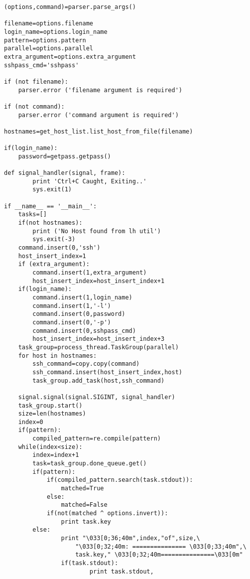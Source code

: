\documentclass[a4paper,11pt]{article}
\begin{document}
\begin{lstlisting}
(options,command)=parser.parse_args()

filename=options.filename
login_name=options.login_name
pattern=options.pattern
parallel=options.parallel
extra_argument=options.extra_argument
sshpass_cmd='sshpass'

if (not filename):
    parser.error ('filename argument is required')

if (not command):
    parser.error ('command argument is required')

hostnames=get_host_list.list_host_from_file(filename)

if(login_name):
    password=getpass.getpass()

def signal_handler(signal, frame):
        print 'Ctrl+C Caught, Exiting..'
        sys.exit(1)

if __name__ == '__main__':
    tasks=[]
    if(not hostnames):
        print ('No Host found from lh util')
        sys.exit(-3)
    command.insert(0,'ssh')
    host_insert_index=1
    if (extra_argument):
        command.insert(1,extra_argument)
        host_insert_index=host_insert_index+1
    if(login_name):
        command.insert(1,login_name)
        command.insert(1,'-l')
        command.insert(0,password)
        command.insert(0,'-p')
        command.insert(0,sshpass_cmd)
        host_insert_index=host_insert_index+3
    task_group=process_thread.TaskGroup(parallel)
    for host in hostnames:
        ssh_command=copy.copy(command)
        ssh_command.insert(host_insert_index,host)
        task_group.add_task(host,ssh_command)

    signal.signal(signal.SIGINT, signal_handler)
    task_group.start()
    size=len(hostnames)
    index=0
    if(pattern):
        compiled_pattern=re.compile(pattern)
    while(index<size):
        index=index+1
        task=task_group.done_queue.get()
        if(pattern):
            if(compiled_pattern.search(task.stdout)):
                matched=True
            else:
                matched=False
            if(not(matched ^ options.invert)):
                print task.key 
        else:
                print "\033[0;36;40m",index,"of",size,\
                    "\033[0;32;40m: =============== \033[0;33;40m",\
                    task.key," \033[0;32;40m===============\033[0m"
                if(task.stdout):
                        print task.stdout,

\end{lstlisting}
\end{document}
